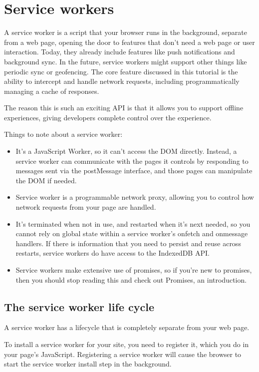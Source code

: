\documentclass[14pt,a4paper,final]{extreport}
\begin{document}
\section{Service workers}
\item A service worker is a script that your browser runs in the background, separate from a web page, opening the door to features that don't need a web page or user interaction. Today, they already include features like push notifications and background sync. In the future, service workers might support other things like periodic sync or geofencing. The core feature discussed in this tutorial is the ability to intercept and handle network requests, including programmatically managing a cache of responses.

The reason this is such an exciting API is that it allows you to support offline experiences, giving developers complete control over the experience.

\item Things to note about a service worker:
\begin{itemize}
    \item It's a JavaScript Worker, so it can't access the DOM directly. Instead, a service worker can communicate with the pages it controls by responding to messages sent via the postMessage interface, and those pages can manipulate the DOM if needed.
    \item Service worker is a programmable network proxy, allowing you to control how network requests from your page are handled.
    \item It's terminated when not in use, and restarted when it's next needed, so you cannot rely on global state within a service worker's onfetch and onmessage handlers. If there is information that you need to persist and reuse across restarts, service workers do have access to the IndexedDB API.
    \item Service workers make extensive use of promises, so if you're new to promises, then you should stop reading this and check out Promises, an introduction.
\end{itemize}
\subsection{The service worker life cycle}
\item A service worker has a lifecycle that is completely separate from your web page.

To install a service worker for your site, you need to register it, which you do in your page's JavaScript. Registering a service worker will cause the browser to start the service worker install step in the background.
\end{document}
